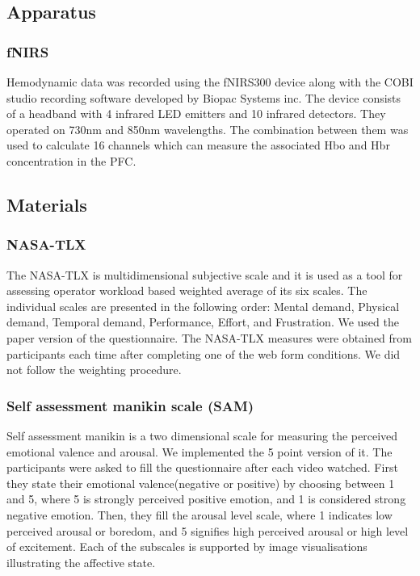 \documentclass[../main/Feedback.tex]{subfiles}
\begin{document}
\subsection{Apparatus}
\subsubsection{fNIRS}
Hemodynamic data was recorded using the fNIRS300 device along with the COBI studio recording software developed by Biopac Systems inc. The device consists of a headband with 4 infrared LED emitters and 10 infrared detectors.
They operated on 730nm and 850nm wavelengths. The combination between them was used to calculate 16 channels which can measure the associated Hbo and Hbr concentration in the PFC.
\subsection{Materials}
\subsubsection{NASA-TLX}
The NASA-TLX\cite{nasatlx} is multidimensional subjective scale and it is used as a tool for assessing operator workload based weighted average of its six scales. The individual scales are presented in the following order: Mental demand, Physical demand, Temporal demand, Performance, Effort, and Frustration. We used the paper version of the questionnaire. The NASA-TLX measures were obtained from participants each time after completing one of the web form conditions. We did not follow the weighting procedure.
\subsubsection{Self assessment manikin scale (SAM)}
Self assessment manikin\cite{bradley1994measuring} is a two dimensional scale for measuring the perceived emotional valence and arousal. We implemented the 5 point version of it. The participants were asked to fill the questionnaire after each video watched. First they state their emotional valence(negative or positive) by choosing between 1 and 5, where 5 is strongly perceived positive emotion, and 1 is considered strong negative emotion. Then, they fill the arousal level scale, where 1 indicates low perceived arousal or boredom, and 5 signifies high perceived arousal or high level of excitement. Each of the subscales is supported by image visualisations illustrating the affective state.
\end{document}
